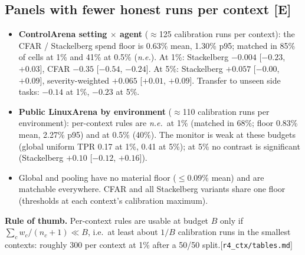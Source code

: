 \documentclass[11pt]{article}
\newcommand{\tE}{\textsf{\scriptsize\textcolor{ink2}{[E]}}\xspace}
\newcommand{\src}[1]{{\footnotesize\textcolor{ink2}{[\nolinkurl{#1}]}}}
\newcommand{\NE}{\textit{n.e.}}
\begin{document}
\subsection{Panels with fewer honest runs per context \tE}
\begin{itemize}
\item \textbf{ControlArena setting $\times$ agent} ($\approx$125 calibration runs per context): the CFAR / Stackelberg spend floor is 0.63\% mean, 1.30\% p95; matched in 85\% of cells at 1\% and 41\% at 0.5\% (\NE). At 1\%: Stackelberg $-0.004$ [$-0.23$, $+0.03$], CFAR $-0.35$ [$-0.54$, $-0.24$]. At 5\%: Stackelberg $+0.057$ [$-0.00$, $+0.09$], severity-weighted $+0.065$ [$+0.01$, $+0.09$]. Transfer to unseen side tasks: $-0.14$ at 1\%, $-0.23$ at 5\%.
\item \textbf{Public LinuxArena by environment} ($\approx$110 calibration runs per environment): per-context rules are \NE\ at 1\% (matched in 68\%; floor 0.83\% mean, 2.27\% p95) and at 0.5\% (40\%). The monitor is weak at these budgets (global uniform TPR 0.17 at 1\%, 0.41 at 5\%); at 5\% no contrast is significant (Stackelberg $+0.10$ [$-0.12$, $+0.16$]).
\item Global and pooling have no material floor ($\le0.09\%$ mean) and are matchable everywhere. CFAR and all Stackelberg variants share one floor (thresholds at each context's calibration maximum).
\end{itemize}
\textbf{Rule of thumb.} Per-context rules are usable at budget $B$ only if $\sum_c w_c/(n_c+1)\ll B$, i.e.\ at least about $1/B$ calibration runs in the smallest contexts: roughly 300 per context at 1\% after a 50/50 split.\src{r4_ctx/tables.md}
\end{document}
